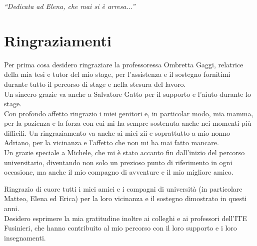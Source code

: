 \cleardoublepage
{}
{}

\begin{flushright}{
    \slshape
    ``Dedicata ad Elena, che mai si è arresa...''} \\
\end{flushright}

\begingroup
\let\clearpage\relax
\let\cleardoublepage\relax

\chapter*{Ringraziamenti}
\noindent\begin{small}Per prima cosa desidero ringraziare la professoressa Ombretta Gaggi, relatrice della mia tesi e tutor del mio stage, per l’assistenza e il sostegno fornitimi durante tutto il percorso di stage e nella stesura del lavoro.\\
Un sincero grazie va anche a Salvatore Gatto per il supporto e l’aiuto durante lo stage.\\

\noindent Con profondo affetto ringrazio i miei genitori e, in particolar modo, mia mamma, per la pazienza e la forza con cui mi ha sempre sostenuta anche nei momenti più difficili. Un ringraziamento va anche ai miei zii e soprattutto a mio nonno Adriano, per la vicinanza e l’affetto che non mi ha mai fatto mancare.\\

\noindent Un grazie speciale a Michele, che mi è stato accanto fin dall’inizio del percorso universitario, diventando non solo un prezioso punto di riferimento in ogni occasione, ma anche il mio compagno di avventure e il mio migliore amico.

\noindent Ringrazio di cuore tutti i miei amici e i compagni di università (in particolare Matteo, Elena ed Erica) per la loro vicinanza e il sostegno dimostrato in questi anni.\\

\noindent Desidero esprimere la mia gratitudine inoltre ai colleghi e ai professori dell’ITE Fusinieri, che hanno contribuito al mio percorso con il loro supporto e i loro insegnamenti.\\
\end{small}
\vspace{0.75cm}

\noindent{\myLocation, \myTime}
\hfill \textit{\myName}

\endgroup